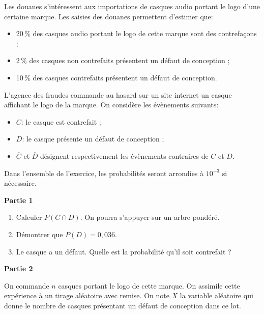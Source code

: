 \medskip

Les douanes s'intéressent aux importations de casques audio portant le logo d'une certaine marque. Les saisies des douanes permettent d'estimer que:

\setlength\parindent{10mm}
\begin{itemize}
\item[$\bullet~~$] 20\,\% des casques audio portant le logo de cette marque sont des contrefaçons ;
\item[$\bullet~~$] 2\,\% des casques non contrefaits présentent un défaut de conception ;\item[$\bullet~~$] 10\,\% des casques contrefaits présentent un défaut de conception.
\end{itemize}
\setlength\parindent{0mm}

L'agence des fraudes commande au hasard sur un site internet un casque affichant le logo de la marque. On considère les évènements suivants:

\setlength\parindent{10mm}
\begin{itemize}
\item[$\bullet~~$] $C$: \og le casque est contrefait \fg{} ;
\item[$\bullet~~$] $D$: \og le casque présente un défaut de conception \fg{} ;
\item[$\bullet~~$] $\overline{C}$ et $\overline{D}$ désignent respectivement les évènements contraires de $C$ et $D$.
\end{itemize}
\setlength\parindent{0mm}

Dans l'ensemble de l'exercice, les probabilités seront arrondies à $10^{-3}$ si nécessaire.

\bigskip

\textbf{Partie 1}

\medskip

\begin{enumerate}
\item Calculer $P(C \cap D)$. On pourra s'appuyer sur un arbre pondéré.
\item Démontrer que $P(D) = 0,036$.
\item Le casque a un défaut. Quelle est la probabilité qu'il soit contrefait ?
\end{enumerate}

\bigskip

\textbf{Partie 2}

\medskip

On commande $n$ casques portant le logo de cette marque. On assimile cette expérience à
un tirage aléatoire avec remise. On note $X$ la variable aléatoire qui donne le nombre de casques présentant un défaut de conception dans ce lot.

